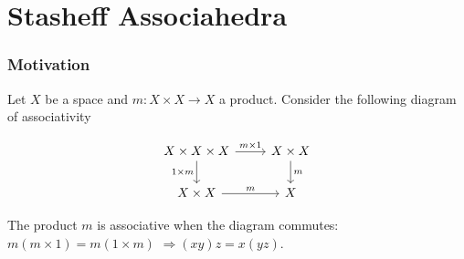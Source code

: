 \documentclass{beamer}
\theoremstyle{definition}
\begin{document}
\section{Stasheff Associahedra}
\begin{frame}[fragile]
\frametitle{Motivation}
Let $X$ be a space and $m:X\times X\to X$ a product. Consider the following diagram of associativity

\[
\begin{tikzcd}
X\times X\times X\arrow[r, "m\times 1"]\arrow[d, "1\times m"'] & X\times X\arrow[d,"m"]\\
X\times X\arrow[r, "m"]& X
\end{tikzcd}
\]\pause

The product $m$ is associative when the diagram commutes: $m(m\times 1)=m(1\times m)$ \pause $\Rightarrow (xy)z=x(yz)$.\pause



\end{frame}
\end{document}
